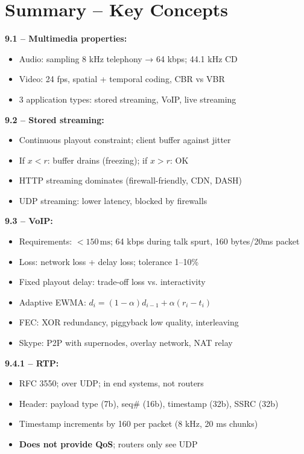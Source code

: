 \begin{imagebox}
\end{imagebox}

\section{Summary -- Key Concepts}

\begin{tcolorbox}[keybox, title=Summary -- Everything you need to know]
\textbf{9.1 -- Multimedia properties:}
\begin{itemize}[nosep]
  \item Audio: sampling 8 kHz telephony → 64 kbps; 44.1 kHz CD
  \item Video: 24 fps, spatial + temporal coding, CBR vs VBR
  \item 3 application types: stored streaming, VoIP, live streaming
\end{itemize}

\medskip
\textbf{9.2 -- Stored streaming:}
\begin{itemize}[nosep]
  \item Continuous playout constraint; client buffer against jitter
  \item If $x < r$: buffer drains (freezing); if $x > r$: OK
  \item HTTP streaming dominates (firewall-friendly, CDN, DASH)
  \item UDP streaming: lower latency, blocked by firewalls
\end{itemize}

\medskip
\textbf{9.3 -- VoIP:}
\begin{itemize}[nosep]
  \item Requirements: $<150\,\text{ms}$; 64 kbps during talk spurt, 160 bytes/20ms packet
  \item Loss: network loss + delay loss; tolerance 1--10\%
  \item Fixed playout delay: trade-off loss vs. interactivity
  \item Adaptive EWMA: $d_i = (1-\alpha)d_{i-1} + \alpha(r_i - t_i)$
  \item FEC: XOR redundancy, piggyback low quality, interleaving
  \item Skype: P2P with supernodes, overlay network, NAT relay
\end{itemize}

\medskip
\textbf{9.4.1 -- RTP:}
\begin{itemize}[nosep]
  \item RFC 3550; over UDP; in end systems, not routers
  \item Header: payload type (7b), seq\# (16b), timestamp (32b), SSRC (32b)
  \item Timestamp increments by 160 per packet (8 kHz, 20 ms chunks)
  \item \textbf{Does not provide QoS}; routers only see UDP
\end{itemize}
\end{tcolorbox}

